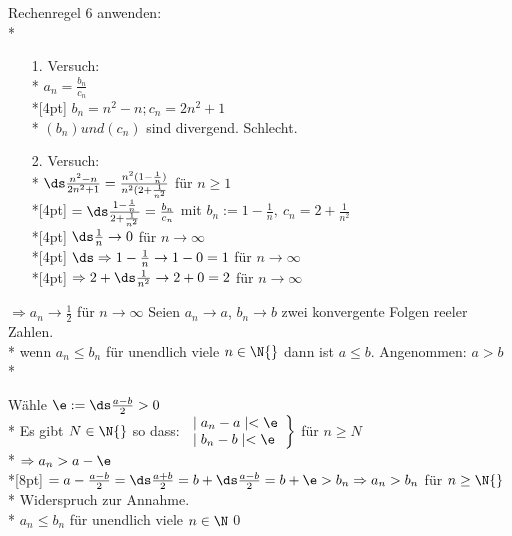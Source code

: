 Rechenregel 6 anwenden:\\*
\begin{itemize}
\item[1.]{Versuch:\\*
$a_n = \frac{b_n}{c_n}$\\*[4pt]
$b_n = n^2 -n; c_n = 2n^2 + 1$\\*
$(b_n) und (c_n)$ sind divergend. Schlecht.}
\item[2.]{Versuch:\\*
$\ds\frac{n^2 - n}{2n^2 + 1} = \frac{n^2(1 - \frac{1}{n})}{n^2(2 + \frac{1}{n^2}}$ für $n \geq 1$\\*[4pt]
$= \ds\frac{1-\frac{1}{n}}{2 +\frac{1}{n^2}}=\frac{b_n}{c_n}$ mit $b_n:=1-\frac{1}{n},\ c_n = 2 + \frac{1}{n^2}$\\*[4pt]
$\ds\frac{1}{n} \to 0$ für $n \to ∞ $\\*[4pt]
$\ds\Rightarrow 1 - \frac{1}{n} \to 1 - 0 = 1$ für $n \to ∞$\\*[4pt]
$\Rightarrow 2 + \ds\frac{1}{n^2} \to 2 + 0 = 2$ für $n \to ∞$}
\end{itemize}
%
$\Rightarrow a_n \to \frac{1}{2}$ für $n \to ∞$
%
Seien $a_n \to a$, $b_n \to b$ zwei konvergente Folgen reeler Zahlen.\\*
wenn $a_n \leq b_n$ für unendlich viele $n \in \N{}$ dann ist $a \leq b$.
\bew
Angenommen: $a > b$\\*

Wähle $\e := \ds\frac{a - b}{2} > 0$\\*
Es gibt $N \in \N{}$ so dass:
$
\left.
\begin{array}{ll}
\mid a_n - a \mid  < \e \\*
\mid b_n - b \mid  < \e
\end{array} \right\rbrace$ für $n \geq N$\\*
$\Rightarrow a_n > a - \e$\\*[8pt]
$= a - \frac{a - b}{2} = \ds\frac{a + b}{2} = b + \ds\frac{a - b}{2}\\*
\\*
= b + \e > b_n \Rightarrow a_n > b_n$ für $n \geq \N{}$\\*
Widerspruch zur Annahme.\\*
$a_n \leq b_n$ für unendlich viele $n \in \N$\qed

